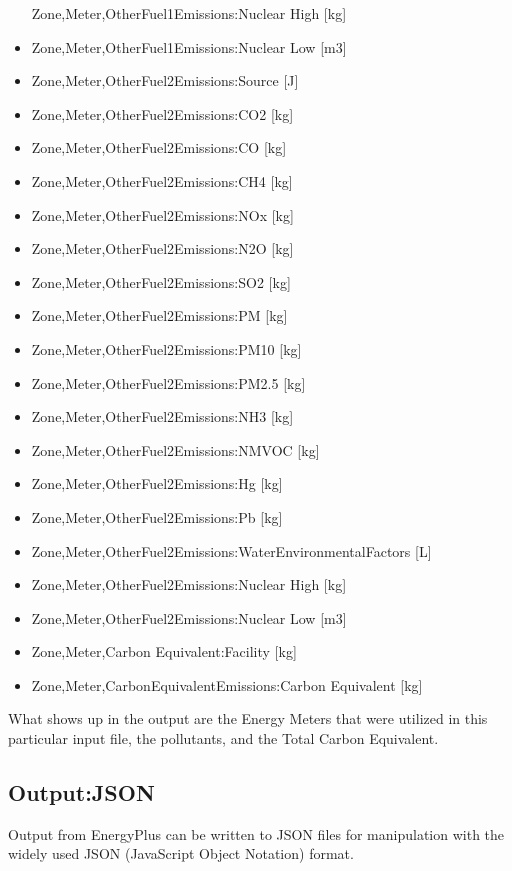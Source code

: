 \begin{itemize}
  Zone,Meter,OtherFuel1Emissions:Nuclear High {[}kg{]}
\item
  Zone,Meter,OtherFuel1Emissions:Nuclear Low {[}m3{]}
\item
  Zone,Meter,OtherFuel2Emissions:Source {[}J{]}
\item
  Zone,Meter,OtherFuel2Emissions:CO2 {[}kg{]}
\item
  Zone,Meter,OtherFuel2Emissions:CO {[}kg{]}
\item
  Zone,Meter,OtherFuel2Emissions:CH4 {[}kg{]}
\item
  Zone,Meter,OtherFuel2Emissions:NOx {[}kg{]}
\item
  Zone,Meter,OtherFuel2Emissions:N2O {[}kg{]}
\item
  Zone,Meter,OtherFuel2Emissions:SO2 {[}kg{]}
\item
  Zone,Meter,OtherFuel2Emissions:PM {[}kg{]}
\item
  Zone,Meter,OtherFuel2Emissions:PM10 {[}kg{]}
\item
  Zone,Meter,OtherFuel2Emissions:PM2.5 {[}kg{]}
\item
  Zone,Meter,OtherFuel2Emissions:NH3 {[}kg{]}
\item
  Zone,Meter,OtherFuel2Emissions:NMVOC {[}kg{]}
\item
  Zone,Meter,OtherFuel2Emissions:Hg {[}kg{]}
\item
  Zone,Meter,OtherFuel2Emissions:Pb {[}kg{]}
\item
  Zone,Meter,OtherFuel2Emissions:WaterEnvironmentalFactors {[}L{]}
\item
  Zone,Meter,OtherFuel2Emissions:Nuclear High {[}kg{]}
\item
  Zone,Meter,OtherFuel2Emissions:Nuclear Low {[}m3{]}
\item
  Zone,Meter,Carbon Equivalent:Facility {[}kg{]}
\item
  Zone,Meter,CarbonEquivalentEmissions:Carbon Equivalent {[}kg{]}
\end{itemize}

What shows up in the output are the Energy Meters that were utilized in this particular input file, the pollutants, and the Total Carbon Equivalent.

\subsection{Output:JSON}\label{outputjson}

Output from EnergyPlus can be written to JSON files for manipulation with the widely used JSON (JavaScript Object Notation) format.

